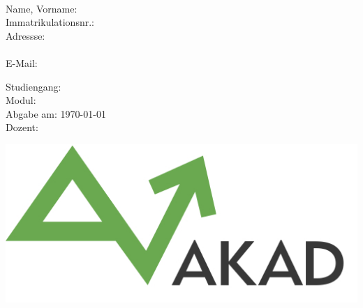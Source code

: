 \thispagestyle{empty}
{\centering
\vspace*{\fill}
\Huge{\textbf{\assi}}

\vspace{\baselineskip}

\Huge{\titel}
\vspace{\baselineskip} \\
\Large{\betreff}

\vspace{\baselineskip}

\begin{multicols}{2}
\raggedright
\setlength{\columnseprule}{1pt}
\begin{small}

Name, Vorname: \tabto{40mm} \name \\
Immatrikulationsnr.:  \tabto{40mm} \immanr \\
Adressse: \tabto{40mm} \strasse \\
\tabto{40mm} \plzort \\
E-Mail: \tabto{40mm} \email

\columnbreak

Studiengang:  \tabto{40mm} \stud \\
Modul:  \tabto{40mm} \modul \\
Abgabe am:  \tabto{40mm} \today \\
Dozent:  \tabto{40mm} \dozent

\end{small}
\end{multicols}{}

\vfill\vfill

\includegraphics[scale=0.35]{Bilder/akad_logo.png}\par}


